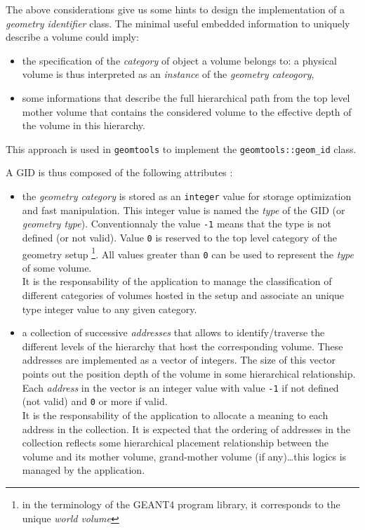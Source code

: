 \pn The above considerations give us some hints to design the implementation of
a \emph{geometry identifier} class. The minimal useful embedded information
to uniquely describe a volume could imply:
\begin{itemize}

\item  the specification  of the  \emph{category} of  object  a volume
  belongs   to:  a  physical   volume  is   thus  interpreted   as  an
  \emph{instance} of the \emph{geometry cateogory},

\item some informations that  describe the full hierarchical path from
  the top level  mother volume that contains the  considered volume to
  the effective depth of the volume in this hierarchy.

\end{itemize}

\pn This approach is used in \texttt{geomtools} to implement
the \texttt{geomtools::geom\_id} class.

\pn A GID is thus composed of the following attributes :
\begin{itemize}

\item the  \emph{geometry category}  is stored as  an \texttt{integer}
  value for  storage optimization and fast  manipulation. This integer
  value is named the \emph{type}  of the GID (or \emph{geometry type}). 
  Conventionnaly the value
  \texttt{-1}  means that  the type  is  not defined  (or not  valid).
  Value  \texttt{0} is  reserved  to  the top  level  category of  the
  geometry  setup \footnote{in the terminology of the
    GEANT4 program library,  it  corresponds  to  the
  unique \emph{world volume}}. All values  greater than \texttt{0} can be used
  to  represent   the  \emph{type}  of   some  volume.  \\It   is  the
  responsability of  the application  to manage the  classification of
  different categories of volumes hosted in the setup and associate an
  unique type integer value to any given category.

\item  a  collection of  successive  \emph{addresses}  that allows  to
  identify/traverse the  different levels  of the hierarchy  that host
  the  corresponding  volume. These  addresses  are  implemented as  a
  vector of integers. The size  of this vector points out the position
  depth  of  the  volume  in  some  hierarchical  relationship.   Each
  \emph{address}  in  the  vector  is  an  integer  value  with  value
  \texttt{-1} if  not defined  (not valid) and  \texttt{0} or  more if
  valid. \\It is  the responsability of the application  to allocate a
  meaning to each  address in the collection. It  is expected that the
  ordering of  addresses in the collection  reflects some hierarchical
  placement relationship between the volume  and its mother volume, grand-mother
  volume (if any)\dots this logics is managed by the application.
  
\end{itemize}

